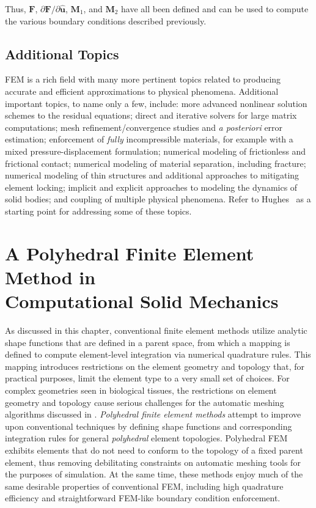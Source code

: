 Thus, $\bm{F}$, ${\partial \bm{F}}/{\partial \hat{\bm{u}}}$, $\bm{M}_1$, and $\bm{M}_2$ have all been defined and can be used to compute the various boundary conditions described previously.

\subsection{Additional Topics}
FEM is a rich field with many more pertinent topics related to producing accurate and efficient approximations to physical phenomena. Additional important topics, to name only a few, include: more advanced nonlinear solution schemes to the residual equations; direct and iterative solvers for large matrix computations; mesh refinement/convergence studies and \textit{a posteriori} error estimation; 
enforcement of \textit{fully} incompressible materials, for example with a mixed pressure-displacement formulation; numerical modeling of frictionless and frictional contact; numerical modeling of material separation, including fracture; numerical modeling of thin structures and additional approaches to mitigating element locking; implicit and explicit approaches to modeling the dynamics of solid bodies; and coupling of multiple physical phenomena. Refer to Hughes~\cite{hughes_2000} as a starting point for addressing some of these topics.

\section[A Polyhedral Finite Element Method in Computational Solid \\ Mechanics]{\texorpdfstring{A Polyhedral Finite Element Method in \\ Computational Solid Mechanics}{A Polyhedral Finite Element Method in Computational Solid \\ Mechanics}}
\label{A Polyhedral Finite Element Method in Computational Solid Mechanics}

As discussed in this chapter, conventional finite element methods utilize analytic shape functions that are defined in a parent space, from which a mapping is defined to compute element-level integration via numerical quadrature rules. This mapping introduces restrictions on the element geometry and topology that, for practical purposes, limit the element type to a very small set of choices. For complex geometries seen in biological tissues, the restrictions on element geometry and topology cause serious challenges for the automatic meshing algorithms discussed in . \textit{Polyhedral finite element methods} attempt to improve upon conventional techniques by defining shape functions and corresponding integration rules for general  \textit{polyhedral} element topologies. Polyhedral FEM exhibits elements that do not need to conform to the topology of a fixed parent element, thus removing debilitating constraints on automatic meshing tools for the purposes of simulation. At the same time, these methods enjoy much of the same desirable properties of conventional FEM, including high quadrature efficiency and straightforward FEM-like boundary condition enforcement.


